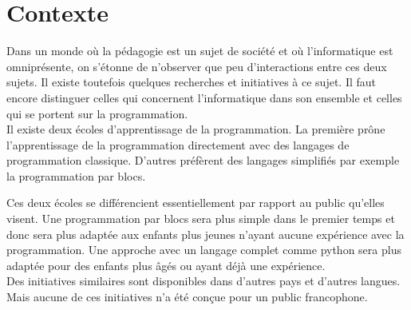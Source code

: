 ﻿\section{Contexte}
\label{intro-context}
Dans un monde où la pédagogie est un sujet de société et où l'informatique est omniprésente, on s'étonne de n'observer que peu d'interactions entre ces deux sujets. Il existe toutefois quelques recherches et initiatives à ce sujet. Il faut encore distinguer celles qui concernent l'informatique dans son ensemble et celles qui se portent sur la programmation.\\

Il existe deux écoles d'apprentissage de la programmation. La première prône l'apprentissage de la programmation directement avec des langages de programmation classique. D'autres préfèrent des langages simplifiés par exemple la programmation par \glspl{bloc}.

Ces deux écoles se différencient essentiellement par rapport au public qu'elles visent. Une programmation par \glspl{bloc} sera plus simple dans le premier temps et donc sera plus adaptée aux enfants plus jeunes n'ayant aucune expérience avec la programmation. Une approche avec un langage complet comme python sera plus adaptée pour des enfants plus âgés ou ayant déjà une expérience.\\

Des initiatives similaires sont disponibles dans d'autres pays et d'autres langues. Mais aucune de ces initiatives n'a été conçue pour un public francophone.




